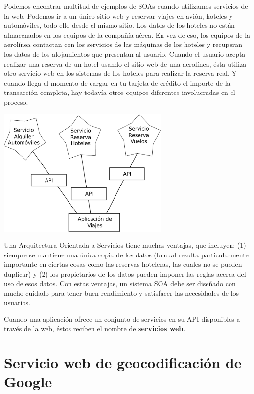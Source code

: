 Podemos encontrar multitud de ejemplos de SOAs cuando utilizamos servicios de la web. Podemos ir a un
único sitio web y reservar viajes en avión, hoteles y automóviles, todo ello desde el
mismo sitio. Los datos de los hoteles no están almacenados en los equipos de la
compañía aérea. En vez de eso, los equipos de la aerolínea contactan con los servicios
de las máquinas de los hoteles y recuperan los datos de los alojamientos que presentan al
usuario. Cuando el usuario acepta realizar una reserva de un hotel usando el sitio web
de una aerolínea, ésta utiliza otro servicio web en los sistemas de los hoteles para realizar
la reserva real. Y cuando llega el momento de cargar en tu tarjeta de crédito el importe de la
transacción completa, hay todavía otros equipos diferentes involucradas en el proceso.

\beforefig
\centerline{\includegraphics[height=2.50in]{figs2/soa.eps}}
\afterfig

Una Arquitectura Orientada a Servicios tiene muchas ventajas, que incluyen: (1)
siempre se mantiene una única copia de los datos (lo cual resulta particularmente
importante en ciertas cosas como las reservas hoteleras, las cuales no se pueden duplicar)
y (2) los propietarios de los datos pueden imponer las reglas acerca del uso de esos datos.
Con estas ventajas, un sistema SOA debe ser diseñado con mucho cuidado para
tener buen rendimiento y satisfacer las necesidades de los usuarios.

Cuando una aplicación ofrece un conjunto de servicios en su API disponibles a través de la
web, éstos reciben el nombre de {\bf servicios web}.

\section{Servicio web de geocodificación de Google}

